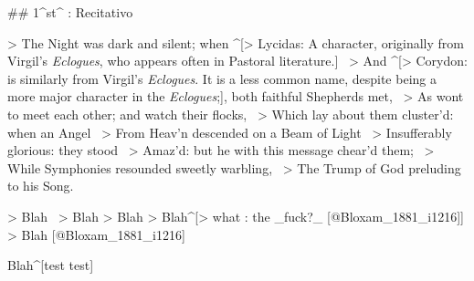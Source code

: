 ## 1^st^ \mvmt: Recitativo


> The Night was dark and silent; when ^[> Lycidas: A character, originally from Virgil's \textit{Eclogues}, who appears often in Pastoral literature.] \
> And ^[> Corydon: is similarly from Virgil's \textit{Eclogues}. It is a less common name, despite being a more major character in the \textit{Eclogues};], both faithful Shepherds met,  \
> As wont to meet each other; and watch their flocks,  \
> Which lay about them cluster’d: when an Angel  \
> From Heav’n descended on a Beam of Light  \
> Insufferably glorious: they stood  \
> Amaz’d: but he with this message chear’d them;  \
> While Symphonies resounded sweetly warbling,  \
> The Trump of God preluding to his Song.

> Blah \
> Blah
> Blah
> Blah^[> what : the _fuck?_ [@Bloxam_1881_i1216]]
> Blah [@Bloxam_1881_i1216]


Blah^[test test]
